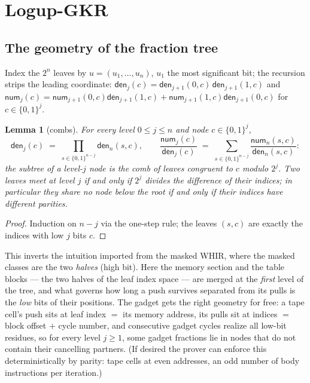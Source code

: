 \documentclass{article}
\newcommand{\num}{\mathsf{num}}
\newcommand{\den}{\mathsf{den}}
\newtheorem{lemma}[theorem]{Lemma}
\theoremstyle{definition}
\begin{document}
\section{Logup-GKR}\label{sec:gkr}

\subsection{The geometry of the fraction tree}

Index the $2^n$ leaves by $u = (u_1, \dots, u_n)$, $u_1$ the most significant bit; the recursion strips the leading coordinate: $\den_{j}(c) = \den_{j+1}(0, c)\, \den_{j+1}(1, c)$ and $\num_j(c) = \num_{j+1}(0,c) \den_{j+1}(1,c) + \num_{j+1}(1,c) \den_{j+1}(0,c)$ for $c \in \{0,1\}^{j}$.

\begin{lemma}[combs]\label{lem:comb}
For every level $0 \leq j \leq n$ and node $c \in \{0,1\}^j$,
\[
\den_j(c) \;=\; \prod_{s \in \{0,1\}^{n-j}} \den_n(s, c) , \qquad \frac{\num_j(c)}{\den_j(c)} \;=\; \sum_{s \in \{0,1\}^{n-j}} \frac{\num_n(s, c)}{\den_n(s, c)} :
\]
the subtree of a level-$j$ node is the \emph{comb} of leaves congruent to $c$ modulo $2^j$. Two leaves meet at level $j$ if and only if $2^j$ divides the difference of their indices; in particular they share no node below the root if and only if their indices have different parities.
\end{lemma}

\begin{proof}
Induction on $n - j$ via the one-step rule; the leaves $(s, c)$ are exactly the indices with low $j$ bits $c$.
\end{proof}

This inverts the intuition imported from the masked WHIR, where the masked classes are the two \emph{halves} (high bit). Here the memory section and the table blocks --- the two halves of the leaf index space --- are merged at the \emph{first} level of the tree, and what governs how long a push survives separated from its pulls is the \emph{low} bits of their positions. The gadget gets the right geometry for free: a tape cell's push sits at leaf index $=$ its memory address, its pulls sit at indices $=$ block offset $+$ cycle number, and consecutive gadget cycles realize all low-bit residues, so for every level $j \geq 1$, some gadget fractions lie in nodes that do not contain their cancelling partners. (If desired the prover can enforce this deterministically by parity: tape cells at even addresses, an odd number of body instructions per iteration.)
\end{document}
